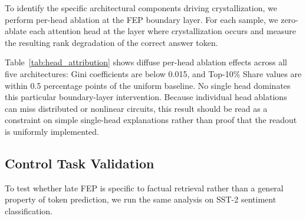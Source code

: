 \documentclass[11pt]{article}
\begin{document}
To identify the specific architectural components driving crystallization, we perform per-head ablation at the FEP boundary layer. For each sample, we zero-ablate each attention head at the layer where crystallization occurs and measure the resulting rank degradation of the correct answer token.

\begin{table}[t]
\centering
\small
{}
\caption{Head-level attribution at the FEP boundary layer. Gini coefficient measures concentration of ablation impact across heads (0=uniform, 1=single head dominates). Top-10\% Share shows the fraction of total rank degradation attributable to the most influential heads; Expected$_{\text{unif}}$: share expected under uniform distribution. All models exhibit near-uniform attribution (Gini$<$0.015), indicating no dominant critical heads.}
\label{tab:head_attribution}
\end{table}

Table~\ref{tab:head_attribution} shows diffuse per-head ablation effects across all five architectures: Gini coefficients are below 0.015, and Top-10\% Share values are within 0.5 percentage points of the uniform baseline. No single head dominates this particular boundary-layer intervention. Because individual head ablations can miss distributed or nonlinear circuits, this result should be read as a constraint on simple single-head explanations rather than proof that the readout is uniformly implemented.

\subsection{Control Task Validation}
\label{sec:control_task}

To test whether late FEP is specific to factual retrieval rather than a general property of token prediction, we run the same analysis on SST-2 sentiment classification.
\end{document}
